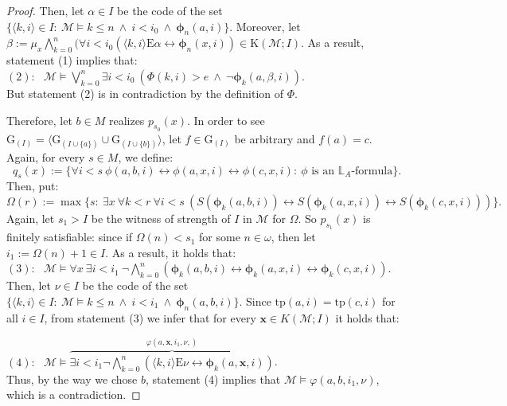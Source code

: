 \documentclass[11pt]{article}
\theoremstyle{plain}
\theoremstyle{definition}
\newcommand{\M}{\mathcal{M}}
\newcommand{\G}{\mathrm{G}}
\newcommand{\E}{\mathrm{E}}
\newcommand{\tp}{\mathrm{tp}}
\begin{document}
\begin{proof}
Then, let $\alpha\in I$ be the code of the set $\{\langle k,i\rangle\in I: \ \M\models k\leq n \ \wedge \ i<i_{0} \ \wedge \ \bm{\phi}_{n}(a,i)\}$. Moreover, let $\beta:=\mu_{x} \bigwedge_{k=0}^{n} (\forall i<i_{0} (\langle k,i\rangle\E\alpha\leftrightarrow\bm{\phi}_{n}(x,i))\in \mathrm{K}(\M;I)$.  As a result, statement (1) implies that:\\

$(2): \ \ \ \M\models 
\bigvee_{k=0}^{n}  
	\exists i<i_{0} \ (\Phi(k,i)>e \ \wedge \ \neg\bm{\phi}_{k}(a,\beta,i))
$.\\

But statement (2) is in contradiction by the definition of $\Phi$.

Therefore, let $b\in M$ realizes $p_{s_{0}}(x)$. In order to see $\G_{(I)}=\langle\G_{(I\cup\{a\})}\cup\G_{(I\cup\{b\})}\rangle$, let $f\in\G_{(I)}$ be arbitrary and $f(a)=c$. Again, for every $s\in M$, we define:
$$q_{s}(x):=\{\forall i<s \ \phi(a,b,i)\leftrightarrow\phi(a,x,i)\leftrightarrow\phi(c,x,i): \ \phi\text{ is an }\mathbb{L}_{A}\text{-formula}\}. $$
Then, put:
$$\Omega(r):=\max\{s: \ \exists x \ \forall k<r \ \forall i<s \ (S(\bm{\phi}_{k}(a,b,i))\leftrightarrow S(\bm{\phi}_{k}(a,x,i))\leftrightarrow S(\bm{\phi}_{k}(c,x,i)))\} .$$
Again, let $s_{1}>I$ be the witness of strength of $I$ in $\M$ for $\Omega$. So $p_{s_{1}}(x)$ is finitely satisfiable: since if $\Omega(n)<s_{1}$ for some $n\in \omega$, then let $i_{1}:=\Omega(n)+1\in I$. As a result, it holds that:\\

$(3): \ \ \ \M\models\forall x \ \exists i<i_{1} \ \neg\bigwedge_{k=0}^{n}(\bm{\phi}_{k}(a,b,i)\leftrightarrow\bm{\phi}_{k}(a,x,i)\leftrightarrow\bm{\phi}_{k}(c,x,i))$.\\




Then, let $\nu\in I$ be the code of the set $\{\langle k,i\rangle\in I: \ \M\models k\leq n \ \wedge \ i<i_{1} \ \wedge \ \bm{\phi}_{n}(a,b,i)\}$.   Since $\tp(a,i)=\tp(c,i)$ for all $i\in I$, from statement (3) we infer that for every $\textbf{x}\in K(\M;I)$ it holds that:


$(4): \ \ \ \M\models \overset{\varphi(a,\textbf{x},i_{1},\nu,)}{\overbrace{\exists i<i_{1}  \neg\bigwedge_{k=0}^{n}(\langle k,i\rangle\E\nu\leftrightarrow\bm{\phi}_{k}(a,\textbf{x},i))}}$.\\


Thus,  by the way we chose $b$, statement (4) implies that $\M\models\varphi(a,b,i_{1},\nu)$, which is a contradiction.


\end{proof}
\end{document}
